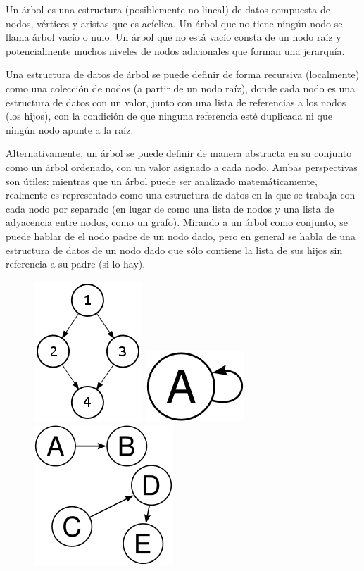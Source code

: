 Un árbol es una estructura (posiblemente no lineal) de datos compuesta de nodos, vértices y aristas que es acíclica. Un árbol que no tiene ningún nodo se llama árbol vacío o nulo. Un árbol que no está vacío consta de un nodo raíz y potencialmente muchos niveles de nodos adicionales que forman una jerarquía. 

Una estructura de datos de árbol se puede definir de forma recursiva (localmente) como una colección de nodos (a partir de un nodo raíz), donde cada nodo es una estructura de datos con un valor, junto con una lista de referencias a los nodos (los hijos), con la condición de que ninguna referencia esté duplicada ni que ningún nodo apunte a la raíz.

Alternativamente, un árbol se puede definir de manera abstracta en su conjunto como un árbol ordenado, con un valor asignado a cada nodo. Ambas perspectivas son útiles: mientras que un árbol puede ser analizado matemáticamente, realmente es representado como una estructura de datos en la que se trabaja con cada nodo por separado (en lugar de como una lista de nodos y una lista de adyacencia entre nodos, como un grafo). Mirando a un árbol como conjunto, se puede hablar de el nodo padre de un nodo dado, pero en general se habla de una estructura de datos de un nodo dado que sólo contiene la lista de sus hijos sin referencia a su padre (si lo hay).

\begin{figure}[!h]
	\centering
	\includegraphics[width=0.2\linewidth]{img/tree_wrong_1}\hspace*{6.5em}
	\includegraphics[width=0.1\linewidth]{img/tree_wrong_2}\hspace*{6.5em}
	\includegraphics[width=0.2\linewidth]{img/tree_wrong_3}
	\label{fig:treewrong1}
\end{figure}


